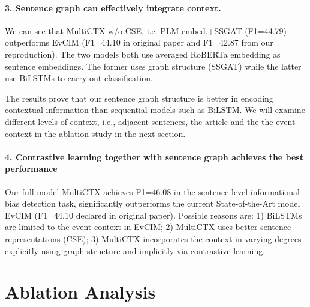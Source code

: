\documentclass[letterpaper]{article} %
\begin{document}


\paragraph{3. Sentence graph can effectively integrate context.} 

We can see that MultiCTX w/o CSE, i.e. PLM embed.+SSGAT (F1=44.79) outperforms EvCIM (F1=44.10 in original paper and F1=42.87 from our reproduction). The two models both use averaged RoBERTa embedding as sentence embeddings. The former uses graph structure (SSGAT) while the latter use BiLSTMs to carry out classification. 

The results prove that our sentence graph structure is better in encoding contextual information than sequential models such as BiLSTM. We will examine different levels of context, i.e., adjacent sentences, the article and the the event context in the ablation study in the next section.


\paragraph{4. Contrastive learning together with sentence graph achieves the best performance} 

Our full model MultiCTX achieves F1=46.08 in the sentence-level informational bias detection task, significantly outperforms the current State-of-the-Art model EvCIM \citep{cohan-etal-2019-pretrained} (F1=44.10 declared in original paper). Possible reasons are: 1) BiLSTMs are limited to the event context in EvCIM; 2) MultiCTX uses better sentence representations (CSE); 3) MultiCTX incorporates the context in varying degrees explicitly using graph structure and implicitly via contrastive learning.


\section{Ablation Analysis}

\end{document}
